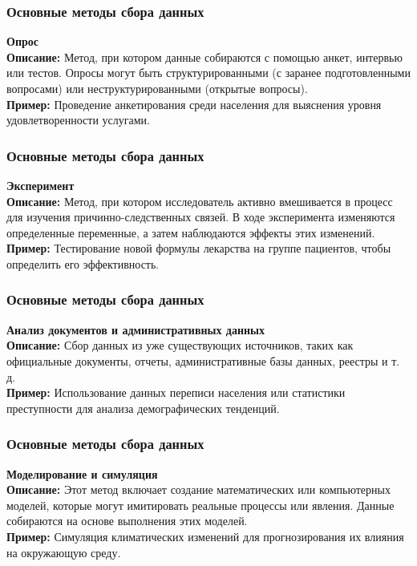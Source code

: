 \documentclass[aspectratio=169]{beamer}
\begin{document}
\begin{frame}
\frametitle{Основные методы сбора данных}
\textbf{Опрос}
\newline\\
\textbf{Описание:} Метод, при котором данные собираются с помощью анкет, интервью или тестов. Опросы могут быть структурированными (с заранее подготовленными вопросами) или неструктурированными (открытые вопросы).
\newline\\
\textbf{Пример:} Проведение анкетирования среди населения для выяснения уровня удовлетворенности услугами.
\end{frame}

\begin{frame}
\frametitle{Основные методы сбора данных}
\textbf{Эксперимент}
\newline\\
\textbf{Описание:} Метод, при котором исследователь активно вмешивается в процесс для изучения причинно-следственных связей. В ходе эксперимента изменяются определенные переменные, а затем наблюдаются эффекты этих изменений.
\newline\\
\textbf{Пример:} Тестирование новой формулы лекарства на группе пациентов, чтобы определить его эффективность.
\end{frame}

\begin{frame}
\frametitle{Основные методы сбора данных}
\textbf{Анализ документов и административных данных}
\newline\\
\textbf{Описание:} Сбор данных из уже существующих источников, таких как официальные документы, отчеты, административные базы данных, реестры и т. д.
\newline\\
\textbf{Пример:} Использование данных переписи населения или статистики преступности для анализа демографических тенденций.
\end{frame}

\begin{frame}
\frametitle{Основные методы сбора данных}
\textbf{Моделирование и симуляция}
\newline\\
\textbf{Описание:} Этот метод включает создание математических или компьютерных моделей, которые могут имитировать реальные процессы или явления. Данные собираются на основе выполнения этих моделей.
\newline\\
\textbf{Пример:} Симуляция климатических изменений для прогнозирования их влияния на окружающую среду.
\end{frame}
\end{document}
